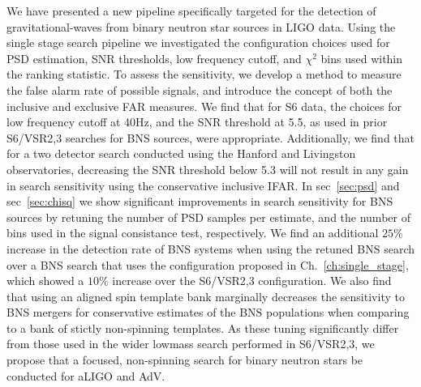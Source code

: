 We have presented a new pipeline specifically targeted for the detection of gravitational-waves from binary neutron star sources in LIGO data. Using the single stage search pipeline we investigated the configuration choices used for PSD estimation, SNR thresholds, low frequency cutoff, and $\chi^2$ bins used within the ranking statistic. To assess the sensitivity, we develop a method to measure the false alarm rate of possible signals, and introduce the concept of both the inclusive and exclusive FAR measures. We find that for S6 data, the choices for low frequency cutoff at 40Hz, and the SNR threshold at 5.5, as used in prior S6/VSR2,3 searches for BNS sources, were appropriate. Additionally, we find that for a two detector search conducted using the Hanford and Livingston observatories, decreasing the SNR threshold below 5.3 will not result in any gain in search sensitivity using the conservative inclusive IFAR. In sec~\ref{sec:psd} and sec~\ref{sec:chisq} we show significant improvements in search sensitivity for BNS sources by retuning the number of PSD samples per estimate, and the number of bins used in the signal consistance test, respectively. We find an additional $25\%$ increase in the detection rate of BNS systems when using the retuned BNS search over a BNS search that uses the configuration proposed in Ch.~\ref{ch:single_stage}, which showed a $10\%$ increase over the S6/VSR2,3 configuration. We also find that using an aligned spin template bank marginally decreases the sensitivity 
to BNS mergers for conservative estimates of the BNS populations when comparing to a bank of stictly non-spinning templates. As these tuning significantly differ from those used in the wider lowmass search performed in S6/VSR2,3, we propose that a focused, non-spinning search for binary neutron stars be conducted for aLIGO and AdV.

\label{sec:conclusions}
